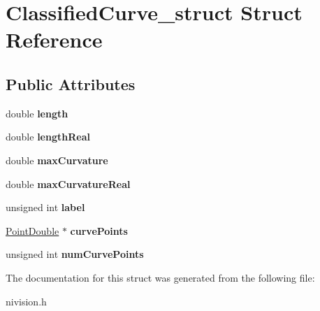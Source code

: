\hypertarget{structClassifiedCurve__struct}{
\section{ClassifiedCurve\_\-struct Struct Reference}
\label{structClassifiedCurve__struct}
}
\subsection*{Public Attributes}
\begin{DoxyCompactItemize}
\item 
\hypertarget{structClassifiedCurve__struct_a49777a78579b5aad326b7da5118a5233}{
double {\bfseries length}}
\label{structClassifiedCurve__struct_a49777a78579b5aad326b7da5118a5233}

\item 
\hypertarget{structClassifiedCurve__struct_ae02ce5db748835253b85cc76457458cc}{
double {\bfseries lengthReal}}
\label{structClassifiedCurve__struct_ae02ce5db748835253b85cc76457458cc}

\item 
\hypertarget{structClassifiedCurve__struct_a059e2729d5c3a8d4176bb37e3ff57bd5}{
double {\bfseries maxCurvature}}
\label{structClassifiedCurve__struct_a059e2729d5c3a8d4176bb37e3ff57bd5}

\item 
\hypertarget{structClassifiedCurve__struct_a3c4d5cd824ab3c89b9061be609d50df4}{
double {\bfseries maxCurvatureReal}}
\label{structClassifiedCurve__struct_a3c4d5cd824ab3c89b9061be609d50df4}

\item 
\hypertarget{structClassifiedCurve__struct_a115ec0af98333121b2a7a6e282ec3f79}{
unsigned int {\bfseries label}}
\label{structClassifiedCurve__struct_a115ec0af98333121b2a7a6e282ec3f79}

\item 
\hypertarget{structClassifiedCurve__struct_ae88387177bcdc86030757fa9cc9dad31}{
\hyperlink{structPointDouble__struct}{PointDouble} $\ast$ {\bfseries curvePoints}}
\label{structClassifiedCurve__struct_ae88387177bcdc86030757fa9cc9dad31}

\item 
\hypertarget{structClassifiedCurve__struct_accd6fbc93a5e54ab9e7d531bee859ffa}{
unsigned int {\bfseries numCurvePoints}}
\label{structClassifiedCurve__struct_accd6fbc93a5e54ab9e7d531bee859ffa}

\end{DoxyCompactItemize}


The documentation for this struct was generated from the following file:\begin{DoxyCompactItemize}
\item 
nivision.h\end{DoxyCompactItemize}

